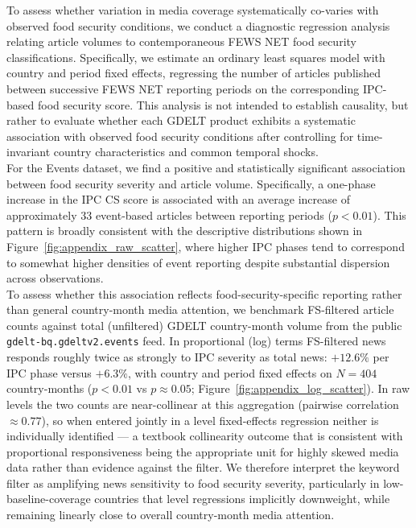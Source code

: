 \documentclass{article}
\begin{document}
\FloatBarrier

To assess whether variation in media coverage systematically co-varies with observed food security conditions, we conduct a diagnostic regression analysis relating article volumes to contemporaneous FEWS NET food security classifications. Specifically, we estimate an ordinary least squares model with country and period fixed effects, regressing the number of articles published between successive FEWS NET reporting periods on the corresponding IPC-based food security score. This analysis is not intended to establish causality, but rather to evaluate whether each GDELT product exhibits a systematic association with observed food security conditions after controlling for time-invariant country characteristics and common temporal shocks. \\

For the Events dataset, we find a positive and statistically significant association between food security severity and article volume. Specifically, a one-phase increase in the IPC CS score is associated with an average increase of approximately 33 event-based articles between reporting periods ($p < 0.01$). This pattern is broadly consistent with the descriptive distributions shown in Figure~\ref{fig:appendix_raw_scatter}, where higher IPC phases tend to correspond to somewhat higher densities of event reporting despite substantial dispersion across observations. \\

To assess whether this association reflects food-security-specific reporting rather than general country-month media attention, we benchmark FS-filtered article counts against total (unfiltered) GDELT country-month volume from the public \texttt{gdelt-bq.gdeltv2.events} feed. In proportional (log) terms FS-filtered news responds roughly twice as strongly to IPC severity as total news: $+12.6\%$ per IPC phase versus $+6.3\%$, with country and period fixed effects on $N=404$ country-months ($p<0.01$ vs $p\approx 0.05$; Figure~\ref{fig:appendix_log_scatter}). In raw levels the two counts are near-collinear at this aggregation (pairwise correlation $\approx 0.77$), so when entered jointly in a level fixed-effects regression neither is individually identified — a textbook collinearity outcome that is consistent with proportional responsiveness being the appropriate unit for highly skewed media data rather than evidence against the filter. We therefore interpret the keyword filter as amplifying news sensitivity to food security severity, particularly in low-baseline-coverage countries that level regressions implicitly downweight, while remaining linearly close to overall country-month media attention. \\
\end{document}

